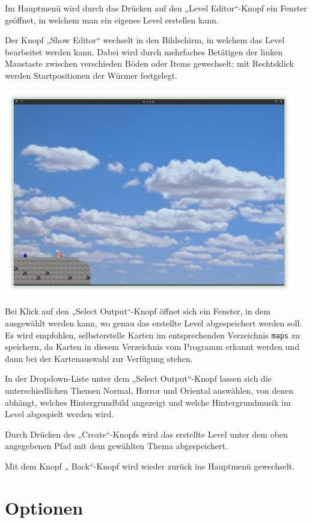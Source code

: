 \documentclass{scrreprt}
\begin{document}
Im Hauptmenü wird durch das Drücken auf den „Level Editor“-Knopf ein Fenster geöffnet, in welchem man ein eigenes Level erstellen kann.

Der Knopf „Show Editor“ wechselt in den Bildschirm, in welchem das Level bearbeitet werden kann. Dabei wird durch mehrfaches Betätigen der linken
Maustaste zwischen verschieden Böden oder Items gewechselt; mit Rechtsklick werden Startpositionen der Würmer festgelegt.

\includegraphics[height=9cm]{Screenshot4.jpg}

Bei Klick auf den „Select Output“-Knopf öffnet sich ein Fenster, in dem ausgewählt werden kann, wo genau das erstellte Level abgespeichert werden soll. Es wird empfohlen, selbsterstelle Karten im entsprechenden Verzeichnis \texttt{maps} zu speichern, da Karten in diesem Verzeichnis vom Programm erkannt werden und dann bei der Kartenauswahl zur Verfügung stehen.

In der Dropdown-Liste unter dem „Select Output“-Knopf lassen sich die unterschiedlichen Themen Normal, Horror und Oriental auswählen, von denen abhängt, welches Hintergrundbild angezeigt und welche Hintergrundmusik im Level abgespielt werden wird.

Durch Drücken des „Create“-Knopfs wird das erstellte Level unter dem oben angegebenen Pfad mit dem gewählten Thema abgespeichert.

Mit dem Knopf „ Back“-Knopf wird wieder zurück ins Hauptmenü gewechselt.

\chapter{Optionen}
\label{Optionen} 
\end{document}
